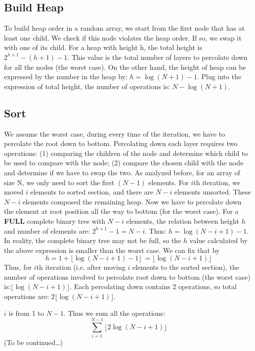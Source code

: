 \documentclass[11pt]{book}
\begin{document}
\subsection{Build Heap}
\label{sec:org4eed6ae}

To build heap order in a random array, we start from the first node that has at least one child. We check if this node violates the heap order. If so, we swap it with one of its child. For a heap with height h, the total height is \(2^{h+1}-(h+1)-1\). This value is the total number of layers to percolate down for all the nodes (the worst case). On the other hand, the height of heap can be expressed by the number in the heap by: \(h = \log(N + 1) - 1\). Plug into the expression of total height, the number of operations is: \(N - \log(N + 1)\).
\subsection{Sort}
\label{sec:org3cd3dc9}

We assume the worst case, during every time of the iteration, we have to percolate the root down to bottom. Percolating down each layer requires two operations: (1) comparing the children of the node and determine which child to be used to compare with the node; (2) compare the chosen child with the node and determine if we have to swap the two. As analyzed before, for an array of size N, we only need to sort the first \((N - 1)\) elements. For \(i\)th iteration, we moved \(i\) elements to sorted section, and there are \(N - i\) elements unsorted. These \(N - i\) elements composed the remaining heap. Now we have to percolate down the element at root position all the way to bottom (for the worst case). For a \textbf{FULL} complete binary tree with \(N - i\) elements, the relation between height \(h\) and number of elements are: \(2^{h + 1} - 1 = N - i\). Thus: \(h = \log(N - i + 1) - 1\). In reality, the complete binary tree may not be full, so the \(h\) value calculated by the above expression is smaller than the worst case. We can fix that by
\[h = 1 + \lfloor\log(N - i + 1) - 1\rfloor\ = \lfloor\log(N - i + 1)\rfloor\]
Thus, for \(i\)th iteration (i.e. after moving \(i\) elements to the sorted section), the number of operations involved to percolate root down to bottom (the worst case) is:\(\lfloor\log(N - i + 1)\rfloor\). Each percolating down contains 2 operations, so total operations are: \(2\lfloor\log(N - i + 1)\rfloor\).

\(i\) is from 1 to \(N - 1\). Thus we sum all the operations:
\begin{equation*}
\sum_{i = 1}^{N - 1} \lfloor2\log(N - i + 1)\rfloor
\end{equation*}
(To be continued\ldots{})
\end{document}
